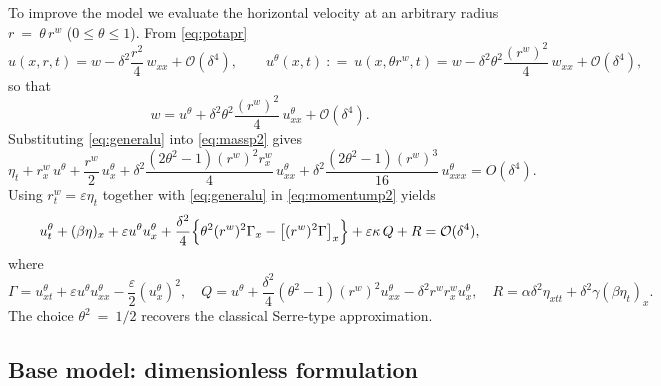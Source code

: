 \documentclass[alpha-refs, 12pt]{wiley-article}
\renewcommand{\O}{\mathcal{O}}
\renewcommand{\leq}{\leqslant}
\newcommand{\eqdef}{\mathrel{\mathop:}=}
\begin{document}
To improve the model we evaluate the horizontal velocity at an arbitrary radius $r\ =\ \theta\,r^{w}$ ($0 \leq \theta \leq 1$). From \eqref{eq:potapr}
\[
  u(x,r,t)
  =w
   -\delta^{2}\frac{r^{2}}{4}\,w_{xx}
   +\O(\delta^{4}),
  \qquad
  u^{\theta}(x,t) \ \eqdef\ u(x,\theta r^{w},t)
  =w-\delta^{2}\theta^{2}\frac{(r^{w})^{2}}{4}\,w_{xx}+\O(\delta^{4}),
\]
so that
\begin{equation}\label{eq:generalu}
  w=u^{\theta}
    +\delta^{2}\theta^{2}\frac{(r^{w})^{2}}{4}\,u^{\theta}_{xx}
    +\O(\delta^{4}).
\end{equation}
Substituting \eqref{eq:generalu} into \eqref{eq:massp2} gives
\begin{equation}\label{eq:massp4}
  \eta_{t}
  +r^{w}_{x}\,u^{\theta}
  +\frac{r^{w}}{2}\,u^{\theta}_{x}
  +\delta^{2}\frac{(2\theta^{2}-1)(r^{w})^{2}r^{w}_{x}}{4}\,
        u^{\theta}_{xx}
  +\delta^{2}\frac{(2\theta^{2}-1)(r^{w})^{3}}{16}\,
        u^{\theta}_{xxx}
  =O(\delta^{4}).
\end{equation}
Using $r^{w}_{t}=\varepsilon\eta_{t}$ together with
\eqref{eq:generalu} in \eqref{eq:momentump2} yields
\begin{equation}\label{eq:momentump4}
  u^{\theta}_{t}
  +(\beta\eta)_{x}
  +\varepsilon u^{\theta}u^{\theta}_{x}
  +\frac{\delta^{2}}{4}
     \Bigl\{\theta^{2}(r^{w})^{2}\Gamma_{x}
            -\bigl[(r^{w})^{2}\Gamma\bigr]_{x}\Bigr\}
  +\varepsilon\kappa\,Q
  +R
  = \O(\delta^{4}),
\end{equation}
where
\begin{equation}\label{eq:gamman}
  \Gamma
  =u^{\theta}_{x t}
   +\varepsilon u^{\theta}u^{\theta}_{xx}
   -\frac{\varepsilon}{2}(u^{\theta}_{x})^{2},\quad
  Q
  =u^{\theta}
   +\frac{\delta^{2}}{4}(\theta^{2}-1)(r^{w})^{2}u^{\theta}_{xx}
   -\delta^{2}r^{w}r^{w}_{x}u^{\theta}_{x},\quad
  R
  =\alpha\delta^{2}\eta_{x t t}
   +\delta^{2}\gamma(\beta\eta_{t})_{x}.
\end{equation}
The choice $\theta^{2}\ =\ 1/2$ recovers the classical Serre-type approximation.

\subsection{Base model: dimensionless formulation}
\end{document}
